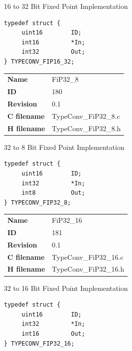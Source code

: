 16 to 32 Bit Fixed Point Implementation

\begin{lstlisting}
typedef struct {
     uint16        ID;
     int16         *In;
     int32         Out;
} TYPECONV_FIP16_32;
\end{lstlisting}

\ifdefined \AddTestReports
{}
\fi
{}
\nopagebreak[0]
\begin{tabular}{l l}
\textbf{Name} & FiP32\_8 \tabularnewline
\textbf{ID} & 180 \tabularnewline
\textbf{Revision} & 0.1 \tabularnewline
\textbf{C filename} & TypeConv\_FiP32\_8.c \tabularnewline
\textbf{H filename} & TypeConv\_FiP32\_8.h \tabularnewline
\end{tabular}
\vspace{1ex}

32 to 8 Bit Fixed Point Implementation

\begin{lstlisting}
typedef struct {
     uint16        ID;
     int32         *In;
     int8          Out;
} TYPECONV_FIP32_8;
\end{lstlisting}

\ifdefined \AddTestReports
{}
\fi
{}
\nopagebreak[0]
\begin{tabular}{l l}
\textbf{Name} & FiP32\_16 \tabularnewline
\textbf{ID} & 181 \tabularnewline
\textbf{Revision} & 0.1 \tabularnewline
\textbf{C filename} & TypeConv\_FiP32\_16.c \tabularnewline
\textbf{H filename} & TypeConv\_FiP32\_16.h \tabularnewline
\end{tabular}
\vspace{1ex}

32 to 16 Bit Fixed Point Implementation

\begin{lstlisting}
typedef struct {
     uint16        ID;
     int32         *In;
     int16         Out;
} TYPECONV_FIP32_16;
\end{lstlisting}

\ifdefined \AddTestReports
{}
\fi
